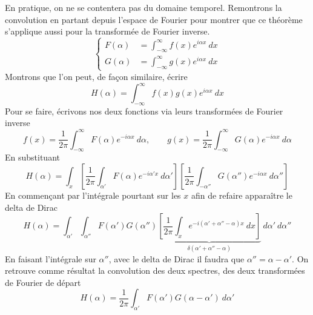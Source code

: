 En pratique, on ne se contentera pas du domaine temporel. Remontrons la convolution en partant 
depuis l'espace de Fourier pour montrer que ce théorème s'applique aussi pour la transformée 
de Fourier inverse.
\begin{equation}
\left\{\begin{array}{ll}
F(\alpha) &= \int_{-\infty}^\infty f(x)e^{i\alpha x}\ dx\\
G(\alpha) &= \int_{-\infty}^\infty g(x)e^{i\alpha x}\ dx
\end{array}\right.
\end{equation}
Montrons que l'on peut, de façon similaire, écrire
\begin{equation}
H(\alpha) = \int_{-\infty}^\infty f(x)g(x)e^{i\alpha x}\ dx
\end{equation}
Pour se faire, écrivons nos deux fonctions via leurs transformées de Fourier inverse
\begin{equation}
f(x) = \frac{1}{2\pi}\int_{-\infty}^\infty F(\alpha)e^{-i\alpha x}\ d\alpha,\qquad 
g(x) = \frac{1}{2\pi}\int_{-\infty}^\infty G(\alpha)e^{-i\alpha x}\ d\alpha
\end{equation}
En substituant
\begin{equation}
H(\alpha) = \int_x \left[\dfrac{1}{2\pi}\int_{\alpha'} F(\alpha)e^{-i\alpha' x}\ d\alpha'
 \right]\left[\frac{1}{2\pi}\int_{-\alpha''} G(\alpha'')e^{-i\alpha x}\ d\alpha'' \right]
\end{equation}
En commençant par l'intégrale pourtant sur les $x$ afin de refaire apparaître le 
delta de Dirac
\begin{equation}
H(\alpha) = \int_{\alpha'}\int_{\alpha''} F(\alpha')G(\alpha'')\underbrace{\left[\dfrac{1}{2\pi}\int_x 
e^{-i(\alpha'+ \alpha'' -\alpha )x}\ dx\right]}_{\delta(\alpha'+ \alpha'' -\alpha)}\ d\alpha'\ d\alpha''
\end{equation}
En faisant l'intégrale sur $\alpha''$, avec le delta de Dirac il faudra que $\alpha'' = \alpha-\alpha'$. 
On retrouve comme résultat la convolution des deux spectres, des deux transformées de Fourier de 
départ 
\begin{equation}
H(\alpha) = \frac{1}{2\pi}\int_{\alpha'} F(\alpha')G(\alpha-\alpha')\ d\alpha'
\end{equation}

